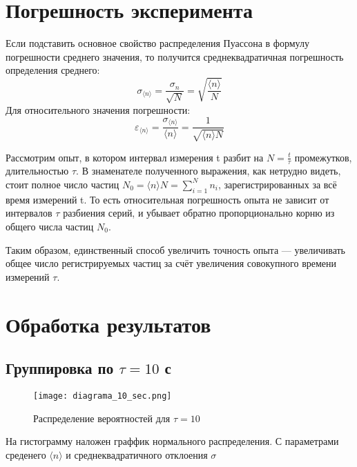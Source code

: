 \documentclass[a4paper]{article}
\begin{document}
\section{Погрешность эксперимента}



Если подставить основное свойство распределения Пуассона в формулу погрешности среднего значения, то получится среднеквадратичная погрешность определения среднего:
\[\sigma_{\langle n \rangle} = \frac{\sigma_{n}}{\sqrt{N}} = \sqrt{\frac{\langle n \rangle}{N}}\]
Для относительного значения погрешности:
\[\varepsilon_{\langle n \rangle} = \frac{\sigma_{\langle n \rangle}}{\langle n \rangle} = \frac{1}{\sqrt{\langle n \rangle N}}\]

Рассмотрим опыт, в котором интервал измерения t разбит на $N = \frac{t}{\tau}$ промежутков, длительностью $\tau$. В знаменателе полученного выражения, как нетрудно видеть, стоит полное число частиц $N_{0} = \langle n \rangle N = \sum\limits_{i=1}^{N} n_{i}$, зарегистрированных за всё время измерений t. То есть относительная погрешность опыта не зависит от интервалов $\tau$ разбиения серий, и убывает обратно пропорционально корню из общего числа частиц $N_{0}$.

Таким образом, единственный способ увеличить точность опыта — увеличивать общее число регистрируемых частиц за счёт увеличения совокупного времени измерений $\tau$.
\newpage

\section{Обработка результатов}
\subsection{Группировка по \( \tau = 10 \) с}
\begin{figure}[h]
    \centering
    \texttt{[image: diagrama\_10\_sec.png]}
    \caption{Распределение вероятностей для  $\tau = 10$}
    \label{fig:my_label}
\end{figure}

На гистограмму наложен граффик нормального распределения. С параметрами среденего $\langle n \rangle$  и среднеквадратичного отклоения $\sigma$
\end{document}
